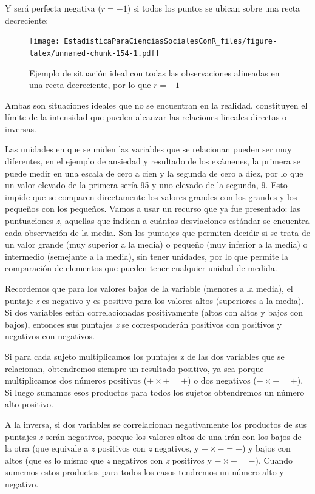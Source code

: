 \documentclass[]{book}
\begin{document}
Y será perfecta negativa (\(r = - 1\)) si todos los puntos se ubican sobre una recta decreciente:

\begin{figure}
\centering
\texttt{[image: EstadisticaParaCienciasSocialesConR\_files/figure-latex/unnamed-chunk-154-1.pdf]}
\caption{\label{fig:unnamed-chunk-154}Ejemplo de situación ideal con todas las observaciones alineadas en una recta decreciente, por lo que \(r = - 1\)}
\end{figure}

Ambas son situaciones ideales que no se encuentran en la realidad,
constituyen el límite de la intensidad que pueden alcanzar las
relaciones lineales directas o inversas.

Las unidades en que se miden las variables que se relacionan pueden ser
muy diferentes, en el ejemplo de ansiedad y resultado de los exámenes,
la primera se puede medir en una escala de cero a cien y la segunda de cero a diez, por lo que
un valor elevado de la primera sería 95 y uno elevado de la segunda, 9.
Esto impide que se comparen directamente los valores grandes con los
grandes y los pequeños con los pequeños. Vamos a usar un recurso que ya fue presentado: las puntuaciones \emph{z}, aquellas que indican a cuántas desviaciones estándar se encuentra cada observación de la media. Son los puntajes que permiten decidir si se trata de un valor grande (muy superior a la media) o pequeño (muy inferior a la media) o intermedio (semejante a la media), sin tener unidades, por lo que permite la comparación de elementos que pueden tener cualquier unidad de medida.

Recordemos que para los valores bajos de la variable (menores a la media), el puntaje \emph{z} es negativo y es positivo para los valores altos (superiores a la media). Si dos variables están correlacionadas
positivamente (altos con altos y bajos con bajos), entonces sus puntajes \emph{z} se corresponderán positivos con positivos y negativos con negativos.

Si para cada sujeto multiplicamos los puntajes z de las dos variables
que se relacionan, obtendremos siempre un resultado positivo, ya sea
porque multiplicamos dos números positivos (\(+\times+=+\)) o dos negativos (\(-\times-=+\)). Si luego sumamos esos productos para todos los sujetos obtendremos un número alto positivo.

A la inversa, si dos variables se correlacionan negativamente los productos de sus puntajes \emph{z} serán negativos, porque los valores altos de una irán con los bajos de la otra (que equivale a \emph{z} positivos con \emph{z} negativos, y \(+\times-=-\)) y bajos con altos (que es lo mismo que \emph{z} negativos con \emph{z} positivos y \(-\times+=-\)). Cuando sumemos estos productos para todos los casos tendremos un número alto y negativo.
\end{document}
